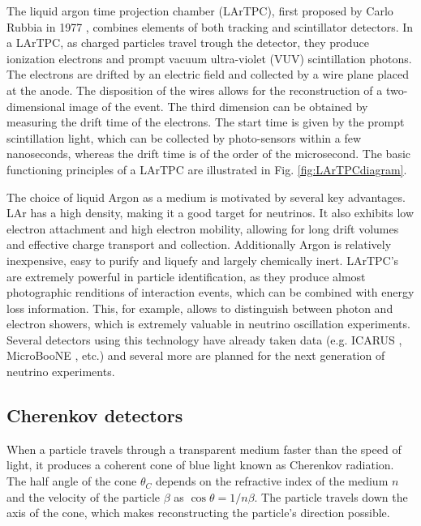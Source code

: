 The liquid argon time projection chamber (LArTPC), first proposed by Carlo Rubbia in 1977 \cite{Rubbia:1977zz}, combines elements of both tracking and scintillator detectors. In a LArTPC, as charged particles travel trough the detector, they produce ionization electrons and prompt vacuum ultra-violet (VUV) scintillation photons. The electrons are drifted by an electric field and collected by a wire plane placed at the anode. The disposition of the wires allows for the reconstruction of a two-dimensional image of the event. The third dimension can be obtained by measuring the drift time of the electrons. The start time is given by the prompt scintillation light, which can be collected by photo-sensors within a few nanoseconds, whereas the drift time is of the order of the microsecond. The basic functioning principles of a LArTPC are illustrated in Fig. \ref{fig:LArTPCdiagram}.

The choice of liquid Argon as a medium is motivated by several key advantages. LAr has a high density, making it a good target for neutrinos. It also exhibits low electron attachment and high electron mobility, allowing for long drift volumes and effective charge transport and collection. Additionally Argon is relatively inexpensive, easy to purify and liquefy and largely chemically inert. LArTPC's are extremely powerful in particle identification, as they produce almost photographic renditions of interaction events, which can be combined with energy loss information. This, for example, allows to distinguish between photon and electron showers, which is extremely valuable in neutrino oscillation experiments. Several detectors using this technology have already taken data (e.g. ICARUS \cite{ICARUS:2004wqc}, MicroBooNE \cite{MicroBooNE:2016pwy}, etc.) and several more are planned for the next generation of neutrino experiments. 
\subsection{Cherenkov detectors}
When a particle travels through a transparent medium faster than the speed of light, it produces a coherent cone of blue light known as Cherenkov radiation. The half angle of the cone $\theta_C$ depends on the refractive index of the medium $n$ and the velocity of the particle $\beta$ as $\cos\theta = 1/n\beta$. The particle travels down the axis of the cone, which makes reconstructing the particle's direction possible.

